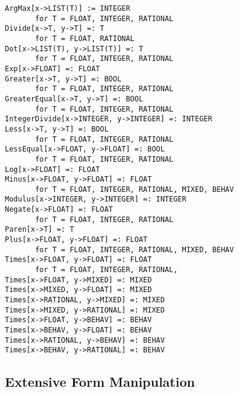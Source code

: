 \begin{verbatim}
ArgMax[x->LIST(T)] := INTEGER
       for T = FLOAT, INTEGER, RATIONAL
Divide[x->T, y->T] =: T
       for T = FLOAT, RATIONAL  
Dot[x->LIST(T), y->LIST(T)] =: T
       for T = FLOAT, INTEGER, RATIONAL
Exp[x->FLOAT] =: FLOAT
Greater[x->T, y->T] =: BOOL
       for T = FLOAT, INTEGER, RATIONAL
GreaterEqual[x->T, y->T] =: BOOL
       for T = FLOAT, INTEGER, RATIONAL
IntegerDivide[x->INTEGER, y->INTEGER] =: INTEGER
Less[x->T, y->T] =: BOOL
       for T = FLOAT, INTEGER, RATIONAL
LessEqual[x->FLOAT, y->FLOAT] =: BOOL
       for T = FLOAT, INTEGER, RATIONAL
Log[x->FLOAT] =: FLOAT
Minus[x->FLOAT, y->FLOAT] =: FLOAT
       for T = FLOAT, INTEGER, RATIONAL, MIXED, BEHAV
Modulus[x->INTEGER, y->INTEGER] =: INTEGER
Negate[x->FLOAT] =: FLOAT
       for T = FLOAT, INTEGER, RATIONAL
Paren[x->T] =: T
Plus[x->FLOAT, y->FLOAT] =: FLOAT
       for T = FLOAT, INTEGER, RATIONAL, MIXED, BEHAV
Times[x->FLOAT, y->FLOAT] =: FLOAT
       for T = FLOAT, INTEGER, RATIONAL,
Times[x->FLOAT, y->MIXED] =: MIXED
Times[x->MIXED, y->FLOAT] =: MIXED
Times[x->RATIONAL, y->MIXED] =: MIXED
Times[x->MIXED, y->RATIONAL] =: MIXED
Times[x->FLOAT, y->BEHAV] =: BEHAV
Times[x->BEHAV, y->FLOAT] =: BEHAV
Times[x->RATIONAL, y->BEHAV] =: BEHAV
Times[x->BEHAV, y->RATIONAL] =: BEHAV
\end{verbatim}

\subsection{Extensive Form Manipulation}

